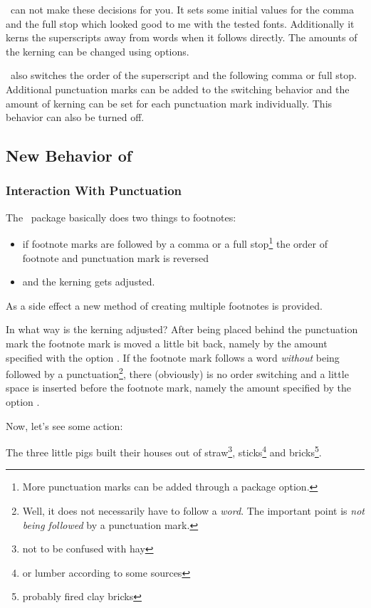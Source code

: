 \documentclass{fnpct-manual}
\begin{document}
\fnpct\ can not make these decisions for you.  It sets some initial values for
the comma and the full stop which looked good to me with the tested fonts.
Additionally it kerns the superscripts away from words when it follows
directly.  The amounts of the kerning can be changed using options.

\fnpct\ also switches the order of the superscript and the following comma or
full stop.  Additional punctuation marks can be added to the switching
behavior and the amount of kerning can be set for each punctuation mark
individually.  This behavior can also be turned off.

\subsection{New Behavior of }
\subsubsection{Interaction With Punctuation}
The \fnpct\ package basically does two things to footnotes:
\begin{itemize}
  \item if footnote marks are followed by a comma or a full stop\footnote{More
    punctuation marks can be added through a package option.} the order of
  footnote and punctuation mark is reversed
\item and the kerning gets adjusted.
\end{itemize}
As a side effect a new method of creating multiple
footnotes is provided.

In what way is the kerning adjusted?  After being placed behind the
punctuation mark the footnote mark is moved a little bit back, namely by the
amount specified with the option .  If the footnote
mark follows a word \emph{without} being followed by a
punctuation\footnote{Well, it does not necessarily have to follow a
  \emph{word}.  The important point is \emph{not being followed} by a
  punctuation mark.}, there (obviously) is no order switching and a little
space is inserted before the footnote mark, namely the amount specified by the
option .

Now, let's see some action:
\begin{example}
  The three little pigs built their houses out of straw\footnote{not to be
    confused with hay}, sticks\footnote{or lumber according to some sources}
  and bricks\footnote{probably fired clay bricks}.
\end{example}
\end{document}
